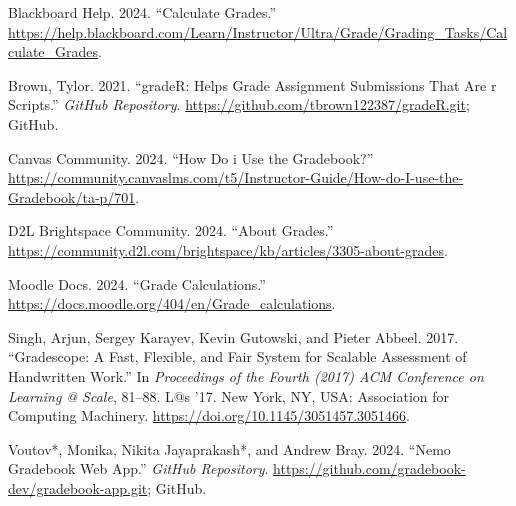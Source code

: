 \documentclass[10pt,a4paper,onecolumn]{article}
\newlength{\cslhangindent}
\newlength{\cslentryspacingunit} %
\newenvironment{CSLReferences}[2] %
 {%
  \setlength{\parindent}{0pt}
  \ifodd #1
  \let\oldpar\par
  \def\par{\hangindent=\cslhangindent\oldpar}
  \fi
  \setlength{\parskip}{#2\cslentryspacingunit}
 }%
 {}
\begin{document}
\hypertarget{refs}{}
\begin{CSLReferences}{1}{0}
\leavevmode{}%
Blackboard Help. 2024. {``Calculate Grades.''}
\url{https://help.blackboard.com/Learn/Instructor/Ultra/Grade/Grading_Tasks/Calculate_Grades}.

\leavevmode{}%
Brown, Tylor. 2021. {``gradeR: Helps Grade Assignment Submissions That
Are r Scripts.''} \emph{GitHub Repository}.
\url{https://github.com/tbrown122387/gradeR.git}; GitHub.

\leavevmode{}%
Canvas Community. 2024. {``How Do i Use the Gradebook?''}
\url{https://community.canvaslms.com/t5/Instructor-Guide/How-do-I-use-the-Gradebook/ta-p/701}.

\leavevmode{}%
D2L Brightspace Community. 2024. {``About Grades.''}
\url{https://community.d2l.com/brightspace/kb/articles/3305-about-grades}.

\leavevmode{}%
Moodle Docs. 2024. {``Grade Calculations.''}
\url{https://docs.moodle.org/404/en/Grade_calculations}.

\leavevmode{}%
Singh, Arjun, Sergey Karayev, Kevin Gutowski, and Pieter Abbeel. 2017.
{``Gradescope: A Fast, Flexible, and Fair System for Scalable Assessment
of Handwritten Work.''} In \emph{Proceedings of the Fourth (2017) ACM
Conference on Learning @ Scale}, 81--88. L@s '17. New York, NY, USA:
Association for Computing Machinery.
\url{https://doi.org/10.1145/3051457.3051466}.

\leavevmode{}%
Voutov*, Monika, Nikita Jayaprakash*, and Andrew Bray. 2024. {``Nemo
Gradebook Web App.''} \emph{GitHub Repository}.
\url{https://github.com/gradebook-dev/gradebook-app.git}; GitHub.

\end{CSLReferences}
\end{document}
